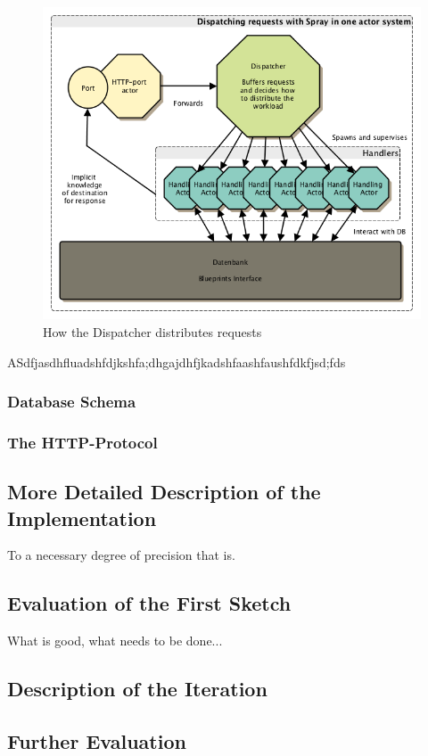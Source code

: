 \documentclass[11p]{scrartcl}
\begin{document}
\begin{figure}[h!]		
 	\includegraphics[scale=0.6]{figures/sprayDispatcher.png}
	\caption{How the Dispatcher distributes requests}
	\label{fig:sprayDispatcher}
\end{figure}

ASdfjasdhfluadshfdjkshfa;dhgajdhfjkadshfaashfaushfdkfjsd;fds

\subsubsection{Database Schema}

\subsubsection{The HTTP-Protocol}


\subsection{More Detailed Description of the Implementation}
To a necessary degree of precision that is.
\subsection{Evaluation of the First Sketch}
What is good, what needs to be done...
\subsection{Description of the Iteration}
\subsection{Further Evaluation}
\end{document}
